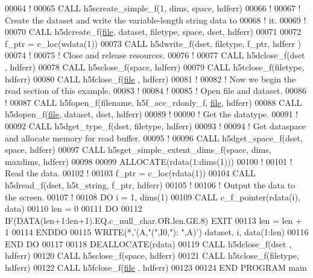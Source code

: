 \begin{DoxyCode}
00064   \textcolor{comment}{!}
00065   \textcolor{keyword}{CALL }h5screate\_simple\_f(1, dims, space, hdferr)
00066   \textcolor{comment}{!}
00067   \textcolor{comment}{! Create the dataset and write the variable-length string data to}
00068   \textcolor{comment}{! it.}
00069   \textcolor{comment}{!}
00070   \textcolor{keyword}{CALL }h5dcreate\_f(\hyperlink{structfile}{file}, dataset, filetype, space, dset, hdferr)
00071 
00072   f\_ptr = c\_loc(wdata(1))
00073   \textcolor{keyword}{CALL }h5dwrite\_f(dset, filetype, f\_ptr, hdferr )
00074   \textcolor{comment}{!}
00075   \textcolor{comment}{! Close and release resources.}
00076   \textcolor{comment}{!}
00077   \textcolor{keyword}{CALL }h5dclose\_f(dset , hdferr)
00078   \textcolor{keyword}{CALL }h5sclose\_f(space, hdferr)
00079   \textcolor{keyword}{CALL }h5tclose\_f(filetype, hdferr)
00080   \textcolor{keyword}{CALL }h5fclose\_f(\hyperlink{structfile}{file} , hdferr)
00081   \textcolor{comment}{!}
00082   \textcolor{comment}{! Now we begin the read section of this example.}
00083   \textcolor{comment}{!}
00084   \textcolor{comment}{!}
00085   \textcolor{comment}{! Open file and dataset.}
00086   \textcolor{comment}{!}
00087   \textcolor{keyword}{CALL }h5fopen\_f(filename, h5f\_acc\_rdonly\_f, \hyperlink{structfile}{file}, hdferr)
00088   \textcolor{keyword}{CALL }h5dopen\_f(\hyperlink{structfile}{file}, dataset, dset, hdferr)
00089   \textcolor{comment}{!}
00090   \textcolor{comment}{! Get the datatype.}
00091   \textcolor{comment}{!}
00092   \textcolor{keyword}{CALL }h5dget\_type\_f(dset, filetype, hdferr)
00093   \textcolor{comment}{!}
00094   \textcolor{comment}{! Get dataspace and allocate memory for read buffer.}
00095   \textcolor{comment}{!}
00096   \textcolor{keyword}{CALL }h5dget\_space\_f(dset, space, hdferr)
00097   \textcolor{keyword}{CALL }h5sget\_simple\_extent\_dims\_f(space, dims, maxdims, hdferr)
00098 
00099   \textcolor{keyword}{ALLOCATE}(rdata(1:dims(1)))
00100   \textcolor{comment}{!}
00101   \textcolor{comment}{! Read the data.}
00102   \textcolor{comment}{!}
00103   f\_ptr = c\_loc(rdata(1))
00104   \textcolor{keyword}{CALL }h5dread\_f(dset, h5t\_string, f\_ptr, hdferr)
00105   \textcolor{comment}{!}
00106   \textcolor{comment}{! Output the data to the screen.}
00107   \textcolor{comment}{!}
00108   \textcolor{keywordflow}{DO} i = 1, dims(1)
00109      \textcolor{keyword}{CALL }c\_f\_pointer(rdata(i), data)
00110      len = 0
00111      \textcolor{keywordflow}{DO}
00112         \textcolor{keywordflow}{IF}(\textcolor{keyword}{DATA}(len+1:len+1).EQ.c\_null\_char.OR.len.GE.8) \textcolor{keywordflow}{EXIT}
00113         len = len + 1
00114 \textcolor{keywordflow}{     ENDDO}
00115      \textcolor{keyword}{WRITE}(*,\textcolor{stringliteral}{'(A,"(",I0,"): ",A)'}) dataset, i, \textcolor{keyword}{data}(1:len)
00116 \textcolor{keywordflow}{  END DO}
00117 
00118   \textcolor{keyword}{DEALLOCATE}(rdata)
00119   \textcolor{keyword}{CALL }h5dclose\_f(dset , hdferr)
00120   \textcolor{keyword}{CALL }h5sclose\_f(space, hdferr)
00121   \textcolor{keyword}{CALL }h5tclose\_f(filetype, hdferr)
00122   \textcolor{keyword}{CALL }h5fclose\_f(\hyperlink{structfile}{file} , hdferr)
00123 
00124 \textcolor{keyword}{END PROGRAM }main
\end{DoxyCode}
